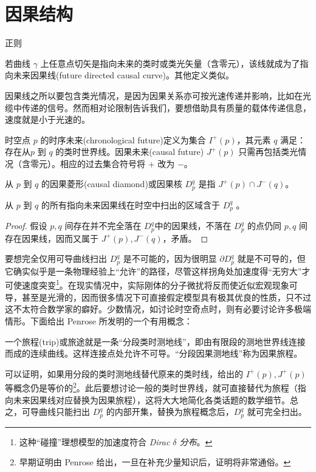 \chapter{因果结构}\label{chpt:causal}


正则

\begin{definition}[因果线]
     若曲线 $\gamma$ 上任意点切矢是指向未来的类时或类光矢量（含零元），该线就成为了指向未来因果线(future directed causal curve)。其他定义类似。
\end{definition}
因果线之所以要包含类光情况，是因为因果关系亦可按光速传递并影响，比如在光缆中传递的信号。然而相对论限制告诉我们，要想借助具有质量的载体传递信息，速度就是小于光速的。
\begin{definition}[未来]
    时空点 $p$ 的时序未来(chronological future)定义为集合 $I^+(p)$，其元素 $q$ 满足：存在从$p$ 到 $q$ 的类时世界线。因果未来(causal future) $J^+(p)$ 只需再包括类光情况（含零元）。相应的过去集合符号将 $+$ 改为 $-$。
\end{definition}
\begin{definition}[因果菱形]
    从 $p$ 到 $q$ 的因果菱形(causal diamond)或因果核 $D_p^q$ 是指 $J^+(p)\cap J^-(q)$。
\end{definition}

\begin{theorem}
    从 $p$ 到 $q$ 的所有指向未来因果线在时空中扫出的区域含于 $D_p^q$ 。
\end{theorem}
\begin{proof}
    假设 $p,q$ 间存在并不完全落在 $D_p^q$中的因果线，不落在 $D_p^q$ 的点仍同 $p,q$ 间存在因果线，因而又属于 $J^+(p),J^-(q)$，矛盾。
\end{proof}
要想完全仅用可导曲线扫出 $D_p^q$ 是不可能的，因为很明显 $\partial D_p^q$ 就是不可导的，但它确实似乎是一条物理经验上“允许”的路径，尽管这样拐角处加速度得“无穷大”才可使速度突变\footnote{这种“碰撞”理想模型的加速度符合 \textit{Dirac $\delta$ 分布}。}。在现实情况中，实际刚体的分子微扰将反而使近似宏观现象可导，甚至是光滑的，因而很多情况下可直接假定模型具有极其优良的性质，只不过这不太符合数学家的癖好。少数情况，如讨论时空奇点时，则有必要讨论许多极端情形。下面给出 Penrose 所发明的一个有用概念：
\begin{definition}[旅程]
    一个旅程(trip)或旅途就是一条“分段类时测地线”，即由有限段的测地世界线连接而成的连续曲线。这样连接点处允许不可导。“分段因果测地线”称为因果旅程。
\end{definition}
可以证明，如果用分段的类时测地线替代原来的类时线，给出的 $I^+(p),J^+(p)$ 等概念仍是等价的\footnote{早期证明由 Penrose 给出，一旦在补充少量知识后，证明将非常通俗。}。此后要想讨论一般的类时世界线，就可直接替代为旅程（指向未来因果线对应替换为因果旅程），这将大大地简化各类话题的数学细节。总之，可导曲线只能扫出 $D_p^q$ 的内部开集，替换为旅程概念后，$D_p^q$ 就可完全扫出。

